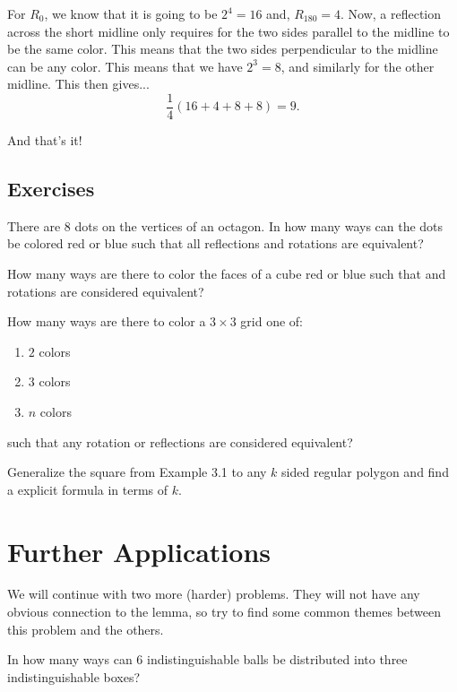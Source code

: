 \documentclass[11pt]{scrartcl}
\begin{document}
For $R_0$, we know that it is going to be $2^4 = 16$ and, $R_{180} = 4$. Now, a reflection across the short midline only requires for the two sides parallel to the midline to be the same color. This means that the two sides perpendicular to the midline can be any color. This means that we have $2^3 = 8$, and similarly for the other midline. This then gives... \[\dfrac{1}{4}(16+4+8+8) = \boxed{9}.\]

And that's it!

\subsection{Exercises}

\begin{problem}[1]{}
There are $8$ dots on the vertices of an octagon. In how many ways can the dots be colored red or blue such that all reflections and rotations are equivalent?
\end{problem}
\begin{problem}[2]{}
How many ways are there to color the faces of a cube red or blue such that and rotations are considered equivalent?
\end{problem}
\begin{problem}[3]{}
How many ways are there to color a $3 \times 3$ grid one of:
\begin{enumerate}
\item $2$ colors
\item $3$ colors
\item $n$ colors
\end{enumerate}
such that any rotation or reflections are considered equivalent?
\end{problem}
\begin{problem}[4H]{}
Generalize the square from Example 3.1 to any $k$ sided regular polygon and find a explicit formula in terms of $k$.
\end{problem}

\newpage

\section{Further Applications}

We will continue with two more (harder) problems. They will not have any obvious connection to the lemma, so try to find some common themes between this problem and the others.

\begin{example*}  
In how many ways can $6$ indistinguishable balls be distributed into three indistinguishable boxes?
\end{example*}
\end{document}
